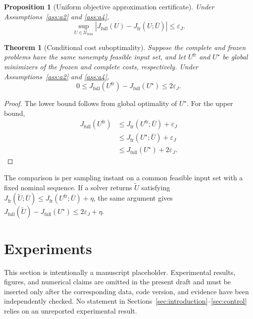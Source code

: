 \documentclass[journal]{IEEEtran}
\newtheorem{theorem}{Theorem}
\newtheorem{proposition}{Proposition}
\begin{document}
\begin{proposition}[Uniform objective approximation certificate]
\label{prop:uniform_cost_certificate}
Under Assumptions~\ref{ass:a2} and \ref{ass:a4},
\begin{equation}
 \sup_{U\in\mathcal U_{\mathrm{feas}}}
 \left|J_{\mathrm{full}}(U)-J_{\mathrm{fr}}(U;\bar U)\right|\le\varepsilon_J.
 \label{eq:uniform_cost_certificate}
\end{equation}
\end{proposition}
\begin{theorem}[Conditional cost suboptimality]
\label{thm:suboptimality}
Suppose the complete and frozen problems have the same nonempty feasible input set, and let $U^{\mathrm{fr}}$ and $U^\star$ be global minimizers of the frozen and complete costs, respectively. Under Assumptions~\ref{ass:a2} and \ref{ass:a4},
\begin{equation}
    0\le J_{\mathrm{full}}(U^{\mathrm{fr}})-J_{\mathrm{full}}(U^\star)
    \le2\varepsilon_J.
    \label{eq:suboptimality_bound}
\end{equation}
\end{theorem}
\begin{proof}
The lower bound follows from global optimality of $U^\star$. For the upper bound,
\begin{align*}
J_{\mathrm{full}}(U^{\mathrm{fr}})
&\le J_{\mathrm{fr}}(U^{\mathrm{fr}};\bar U)+\varepsilon_J\\
&\le J_{\mathrm{fr}}(U^\star;\bar U)+\varepsilon_J\\
&\le J_{\mathrm{full}}(U^\star)+2\varepsilon_J.
\end{align*}
\end{proof}

The comparison is per sampling instant on a common feasible input set with a fixed nominal sequence. If a solver returns $\widetilde U$ satisfying $J_{\mathrm{fr}}(\widetilde U;\bar U)\le J_{\mathrm{fr}}(U^{\mathrm{fr}};\bar U)+\eta$, the same argument gives $J_{\mathrm{full}}(\widetilde U)-J_{\mathrm{full}}(U^\star)\le2\varepsilon_J+\eta$.

\section{Experiments}
\label{sec:experiments}

This section is intentionally a manuscript placeholder. Experimental results, figures, and numerical claims are omitted in the present draft and must be inserted only after the corresponding data, code version, and evidence have been independently checked. No statement in Sections~\ref{sec:introduction}--\ref{sec:control} relies on an unreported experimental result.
\end{document}
